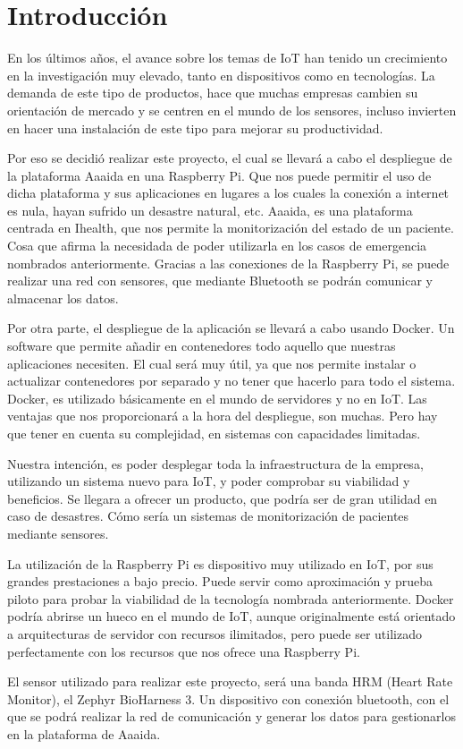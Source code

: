 \cleardoublepage
{}
\chapter*{Introducción}

En los últimos años, el avance sobre los temas de IoT han tenido un crecimiento en la investigación muy elevado, tanto en dispositivos como en tecnologías. La demanda de este tipo de productos, hace que muchas empresas cambien su orientación de mercado y se centren en el mundo de los sensores, incluso invierten en hacer una instalación de este tipo para mejorar su productividad. 

Por eso se decidió realizar este proyecto, el cual se llevará a cabo el despliegue de la plataforma Aaaida en una Raspberry Pi. Que nos puede permitir el uso de dicha plataforma y sus aplicaciones en lugares a los cuales la conexión a internet es nula, hayan sufrido un desastre natural, etc.  Aaaida, es una plataforma centrada en Ihealth, que nos permite la monitorización del estado de un paciente. Cosa que afirma la necesidada de poder utilizarla en los casos de emergencia nombrados anteriormente.
Gracias a las conexiones de la Raspberry Pi, se puede realizar una red con sensores, que mediante Bluetooth se podrán comunicar y almacenar los datos. 

Por otra parte, el despliegue de la aplicación se llevará a cabo usando Docker. Un software que permite añadir en contenedores todo aquello que nuestras aplicaciones necesiten. El cual será muy útil, ya que nos permite instalar o actualizar contenedores por separado y no tener que hacerlo para todo el sistema. Docker, es utilizado básicamente en el mundo de servidores y no en IoT. Las ventajas que nos proporcionará a la hora del despliegue, son muchas. Pero hay que tener en cuenta su complejidad, en sistemas con capacidades limitadas.

Nuestra intención, es poder desplegar toda la infraestructura de la empresa, utilizando un sistema nuevo para IoT, y poder comprobar su viabilidad y beneficios. Se llegara a ofrecer un producto, que podría ser de gran utilidad en caso de desastres. Cómo sería un sistemas de monitorización de pacientes mediante sensores. 

La utilización de la Raspberry Pi es dispositivo muy utilizado en IoT, por sus grandes prestaciones a bajo precio. Puede servir como aproximación y prueba piloto para  probar la viabilidad de la tecnología nombrada anteriormente. Docker podría abrirse un hueco en el mundo de IoT, aunque originalmente está orientado a arquitecturas de servidor con recursos ilimitados, pero puede ser utilizado perfectamente con los recursos que nos ofrece una Raspberry Pi. 

El sensor utilizado para realizar este proyecto, será una banda HRM (Heart Rate Monitor), el Zephyr BioHarness 3. Un dispositivo con conexión bluetooth, con el que se podrá realizar la red de comunicación y generar los datos para gestionarlos en la plataforma de Aaaida. 
